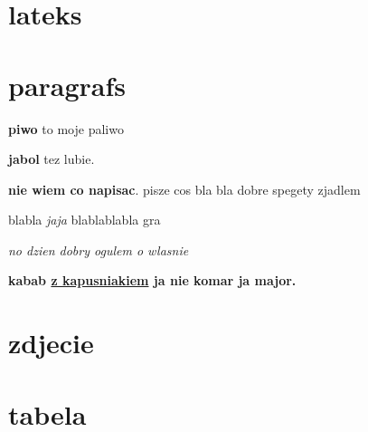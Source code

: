 \documentclass{article}
\begin{document}
\section*{lateks}

\setlength{\parindent}{20pt}

\section*{paragrafs}
\textbf{piwo} to moje paliwo

\textbf{jabol} tez lubie.

\noindent\textbf{nie wiem co napisac}. pisze cos bla bla dobre spegety zjadlem

blabla \emph{jaja} 
blablablabla
gra

\textit{no dzien dobry \emph{ogulem} 
o wlasnie}

\textbf{kabab \underline{z kapusniakiem} 
ja nie komar
ja major.}
\section*{zdjecie}
\pageref{fig:zdjecie}
\section*{tabela}
\pageref{fig:tabela}
\end{document}
